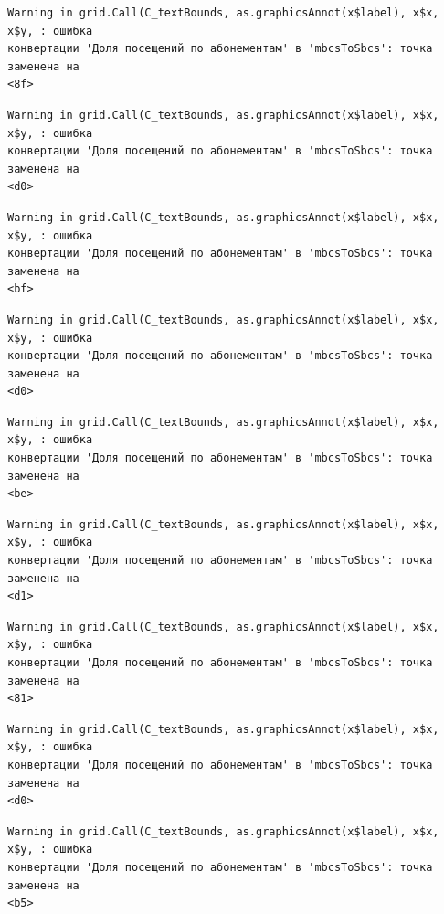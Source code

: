 \documentclass[
  letterpaper,
  DIV=11,
  numbers=noendperiod]{scrreprt}
\begin{document}
\begin{verbatim}
Warning in grid.Call(C_textBounds, as.graphicsAnnot(x$label), x$x, x$y, : ошибка
конвертации 'Доля посещений по абонементам' в 'mbcsToSbcs': точка заменена на
<8f>
\end{verbatim}

\begin{verbatim}
Warning in grid.Call(C_textBounds, as.graphicsAnnot(x$label), x$x, x$y, : ошибка
конвертации 'Доля посещений по абонементам' в 'mbcsToSbcs': точка заменена на
<d0>
\end{verbatim}

\begin{verbatim}
Warning in grid.Call(C_textBounds, as.graphicsAnnot(x$label), x$x, x$y, : ошибка
конвертации 'Доля посещений по абонементам' в 'mbcsToSbcs': точка заменена на
<bf>
\end{verbatim}

\begin{verbatim}
Warning in grid.Call(C_textBounds, as.graphicsAnnot(x$label), x$x, x$y, : ошибка
конвертации 'Доля посещений по абонементам' в 'mbcsToSbcs': точка заменена на
<d0>
\end{verbatim}

\begin{verbatim}
Warning in grid.Call(C_textBounds, as.graphicsAnnot(x$label), x$x, x$y, : ошибка
конвертации 'Доля посещений по абонементам' в 'mbcsToSbcs': точка заменена на
<be>
\end{verbatim}

\begin{verbatim}
Warning in grid.Call(C_textBounds, as.graphicsAnnot(x$label), x$x, x$y, : ошибка
конвертации 'Доля посещений по абонементам' в 'mbcsToSbcs': точка заменена на
<d1>
\end{verbatim}

\begin{verbatim}
Warning in grid.Call(C_textBounds, as.graphicsAnnot(x$label), x$x, x$y, : ошибка
конвертации 'Доля посещений по абонементам' в 'mbcsToSbcs': точка заменена на
<81>
\end{verbatim}

\begin{verbatim}
Warning in grid.Call(C_textBounds, as.graphicsAnnot(x$label), x$x, x$y, : ошибка
конвертации 'Доля посещений по абонементам' в 'mbcsToSbcs': точка заменена на
<d0>
\end{verbatim}

\begin{verbatim}
Warning in grid.Call(C_textBounds, as.graphicsAnnot(x$label), x$x, x$y, : ошибка
конвертации 'Доля посещений по абонементам' в 'mbcsToSbcs': точка заменена на
<b5>
\end{verbatim}
\end{document}
